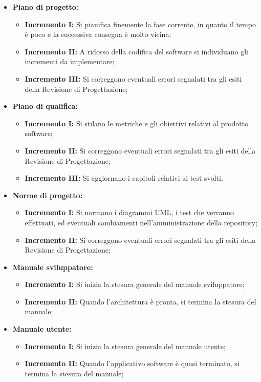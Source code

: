 \documentclass[../piano_di_progetto.tex]{subfiles}
\begin{document}
\begin{itemize}
    \item \textbf{Piano di progetto:}
        \begin{itemize}
            \item \textbf{Incremento I:} Si pianifica finemente la fase corrente, in quanto il tempo è poco e la successiva consegna è molto vicina;
            \item \textbf{Incremento II:} A ridosso della codifica del software si individuano gli incrementi da implementare;
            \item \textbf{Incremento III:} Si correggono eventuali errori segnalati tra gli esiti della Revisione di Progettazione;
        \end{itemize}
        \item \textbf{Piano di qualifica:}
        \begin{itemize}
            \item \textbf{Incremento I:} Si stilano le metriche e gli obiettivi relativi al prodotto software;
            \item \textbf{Incremento II:} Si correggono eventuali errori segnalati tra gli esiti della Revisione di Progettazione;
            \item \textbf{Incremento III:} Si aggiornano i capitoli relativi ai test svolti;
        \end{itemize}
        \item \textbf{Norme di progetto:}
        \begin{itemize}
            \item \textbf{Incremento I:} Si normano i diagrammi UML, i test che verranno effettuati, ed eventuali cambiamenti nell'amministrazione della repository;
            \item \textbf{Incremento II:} Si correggono eventuali errori segnalati tra gli esiti della Revisione di Progettazione;
        \end{itemize}
        \item \textbf{Manuale sviluppatore:}
        \begin{itemize}
            \item \textbf{Incremento I:} Si inizia la stesura generale del manuale sviluppatore;
            \item \textbf{Incremento II:} Quando l'architettura è pronta, si termina la stesura del manuale;
        \end{itemize}
        \item \textbf{Manuale utente:}
        \begin{itemize}
            \item \textbf{Incremento I:} Si inizia la stesura generale del manuale utente;
            \item \textbf{Incremento II:} Quando l'applicativo software è quasi terminato, si termina la stesura del manuale;
        \end{itemize}
\end{itemize}
\end{document}
